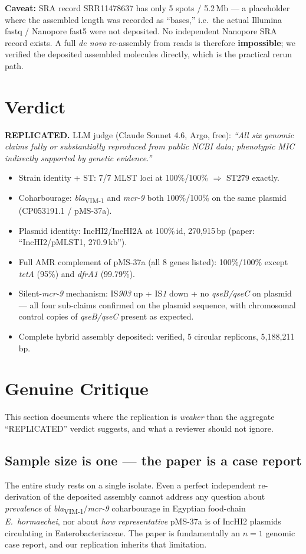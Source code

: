 \documentclass[11pt,letterpaper]{article}
\begin{document}
\textbf{Caveat:} SRA record SRR11478637 has only 5 spots / 5.2\,Mb --- a placeholder where the assembled length was recorded as ``bases,'' i.e.\ the actual Illumina fastq / Nanopore fast5 were not deposited. No independent Nanopore SRA record exists. A full \textit{de novo} re-assembly from reads is therefore \textbf{impossible}; we verified the deposited assembled molecules directly, which is the practical rerun path.

\section{Verdict}

\textbf{\textcolor{green!50!black}{REPLICATED.}} LLM judge (Claude Sonnet 4.6, Argo, free): \textit{``All six genomic claims fully or substantially reproduced from public NCBI data; phenotypic MIC indirectly supported by genetic evidence.''}

\begin{itemize}
\item Strain identity + ST: 7/7 MLST loci at 100\%/100\% $\Rightarrow$ ST279 exactly.
\item Coharbourage: \textit{bla}\textsubscript{VIM-1} and \textit{mcr-9} both 100\%/100\% on the same plasmid (CP053191.1 / pMS-37a).
\item Plasmid identity: IncHI2/IncHI2A at 100\%\,id, 270{,}915\,bp (paper: ``IncHI2/pMLST1, 270.9\,kb'').
\item Full AMR complement of pMS-37a (all 8 genes listed): 100\%/100\% except \textit{tetA} (95\%) and \textit{dfrA1} (99.79\%).
\item Silent-\textit{mcr-9} mechanism: IS\textit{903} up + IS\textit{1} down + no \textit{qseB/qseC} on plasmid --- all four sub-claims confirmed on the plasmid sequence, with chromosomal control copies of \textit{qseB/qseC} present as expected.
\item Complete hybrid assembly deposited: verified, 5 circular replicons, 5{,}188{,}211\,bp.
\end{itemize}

\section{Genuine Critique}
\label{sec:critique}

This section documents where the replication is \textit{weaker} than the aggregate ``REPLICATED'' verdict suggests, and what a reviewer should not ignore.

\subsection{Sample size is one --- the paper is a case report}
The entire study rests on a single isolate. Even a perfect independent re-derivation of the deposited assembly cannot address any question about \textit{prevalence} of \textit{bla}\textsubscript{VIM-1}/\textit{mcr-9} coharbourage in Egyptian food-chain \textit{E.\ hormaechei}, nor about \textit{how representative} pMS-37a is of IncHI2 plasmids circulating in Enterobacteriaceae. The paper is fundamentally an $n=1$ genomic case report, and our replication inherits that limitation.
\end{document}
